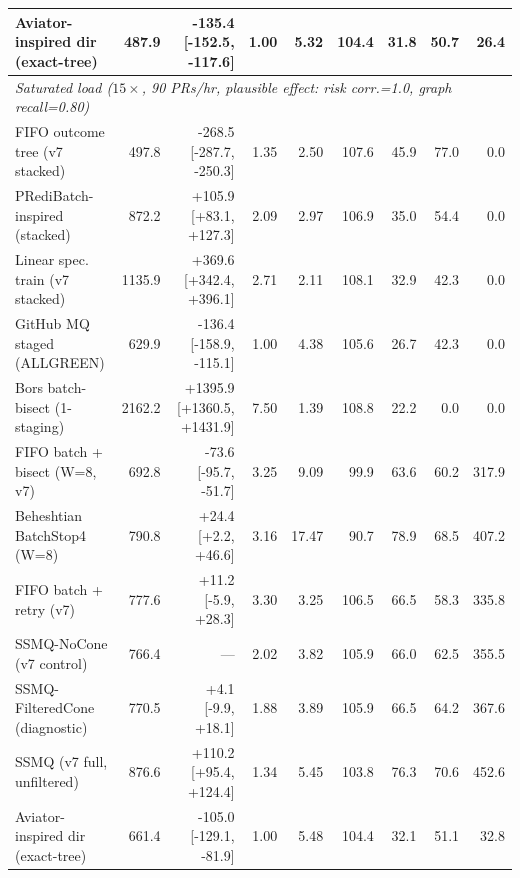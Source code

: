 \begin{table}[t]
\begin{tabular}{lrrrrrrrr}
Aviator-inspired dir (exact-tree) & 487.9 & -135.4 [-152.5, -117.6] & 1.00 & 5.32 & 104.4 & 31.8 & 50.7 & 26.4 \\
\midrule
\multicolumn{9}{l}{\textit{Saturated load ($15\times$, 90 PRs/hr, plausible effect: risk corr.=1.0, graph recall=0.80)}} \\
FIFO outcome tree (v7 stacked) & 497.8 & -268.5 [-287.7, -250.3] & 1.35 & 2.50 & 107.6 & 45.9 & 77.0 & 0.0 \\
PRediBatch-inspired (stacked) & 872.2 & +105.9 [+83.1, +127.3] & 2.09 & 2.97 & 106.9 & 35.0 & 54.4 & 0.0 \\
Linear spec. train (v7 stacked) & 1135.9 & +369.6 [+342.4, +396.1] & 2.71 & 2.11 & 108.1 & 32.9 & 42.3 & 0.0 \\
GitHub MQ staged (ALLGREEN) & 629.9 & -136.4 [-158.9, -115.1] & 1.00 & 4.38 & 105.6 & 26.7 & 42.3 & 0.0 \\
Bors batch-bisect (1-staging) & 2162.2 & +1395.9 [+1360.5, +1431.9] & 7.50 & 1.39 & 108.8 & 22.2 & 0.0 & 0.0 \\
FIFO batch + bisect (W=8, v7) & 692.8 & -73.6 [-95.7, -51.7] & 3.25 & 9.09 & 99.9 & 63.6 & 60.2 & 317.9 \\
Beheshtian BatchStop4 (W=8) & 790.8 & +24.4 [+2.2, +46.6] & 3.16 & 17.47 & 90.7 & 78.9 & 68.5 & 407.2 \\
FIFO batch + retry (v7) & 777.6 & +11.2 [-5.9, +28.3] & 3.30 & 3.25 & 106.5 & 66.5 & 58.3 & 335.8 \\
SSMQ-NoCone (v7 control) & 766.4 & --- & 2.02 & 3.82 & 105.9 & 66.0 & 62.5 & 355.5 \\
SSMQ-FilteredCone (diagnostic) & 770.5 & +4.1 [-9.9, +18.1] & 1.88 & 3.89 & 105.9 & 66.5 & 64.2 & 367.6 \\
SSMQ (v7 full, unfiltered) & 876.6 & +110.2 [+95.4, +124.4] & 1.34 & 5.45 & 103.8 & 76.3 & 70.6 & 452.6 \\
Aviator-inspired dir (exact-tree) & 661.4 & -105.0 [-129.1, -81.9] & 1.00 & 5.48 & 104.4 & 32.1 & 51.1 & 32.8 \\
\bottomrule\end{tabular}\end{table}


